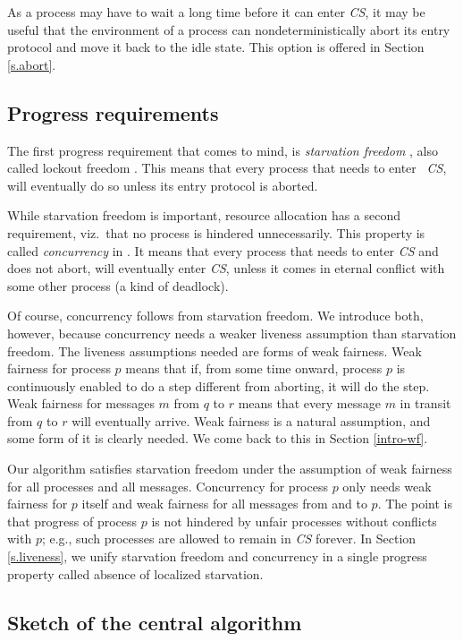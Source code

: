 \documentclass[10pt]{article} \usepackage[english]{babel}
\def\S #1/{\mbox {\textsl{#1}}}
\begin{document}
As a process may have to wait a long time before it can enter \S CS/,
it may be useful that the environment of a process can
nondeterministically abort its entry protocol and move it back to the
idle state.  This option is offered in Section \ref{s.abort}.

\subsection{Progress requirements} \label{progress}

The first progress requirement that comes to mind, is \emph{starvation
  freedom} \cite{ewd651}, also called lockout freedom \cite{Lyn96}.
This means that every process that needs to enter \S
CS/, will eventually do so unless its entry protocol is aborted.

While starvation freedom is important, resource allocation has a
second requirement, viz.\ that no process is hindered unnecessarily.
This property is called \emph{concurrency} in \cite{ChM84,Rhe98}.  It
means that every process that needs to enter \S CS/ and does not
abort, will eventually enter \S CS/, unless it comes in eternal
conflict with some other process (a kind of deadlock).

Of course, concurrency follows from starvation freedom.  We introduce
both, however, because concurrency needs a weaker liveness assumption
than starvation freedom.  The liveness assumptions needed are forms of
weak fairness.  Weak fairness for process $p$ means that if, from some
time onward, process $p$ is continuously enabled to do a step
different from aborting, it will do the step. Weak fairness for
messages $m$ from $q$ to $r$ means that every message $m$ in transit
from $q$ to $r$ will eventually arrive.  Weak fairness is a natural
assumption, and some form of it is clearly needed.  We come back to
this in Section \ref{intro-wf}.

Our algorithm satisfies starvation freedom under the assumption of
weak fairness for all processes and all messages.  Concurrency for
process $p$ only needs weak fairness for $p$ itself and weak fairness
for all messages from and to $p$.  The point is that progress of
process $p$ is not hindered by unfair processes without conflicts with
$p$; e.g., such processes are allowed to remain in \S CS/ forever.  In
Section \ref{s.liveness}, we unify starvation freedom and concurrency
in a single progress property called absence of localized starvation.

\subsection{Sketch of the central algorithm} \label{sketch}
\end{document}
